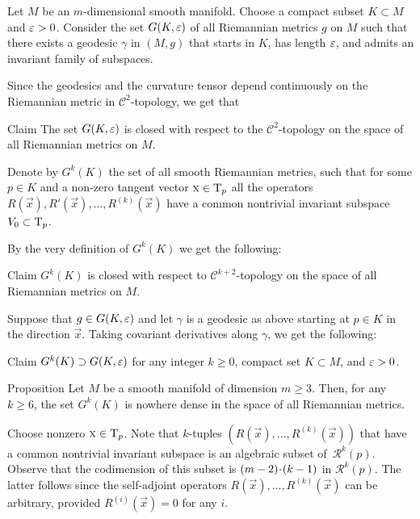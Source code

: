 \documentclass[a4paper,10pt]{article}
\begin{document}
Let $M$ be an $m$-dimensional smooth manifold.
Choose a compact subset $K\subset M$ and $\varepsilon>0$.
Consider the set $G(K,\varepsilon)$ of all Riemannian metrics $g$ on $M$ such that there exists a geodesic $\gamma$ in $(M,g)$ that starts in $K$, has length $\varepsilon$, and admits an invariant family of subspaces.

Since the geodesics and the curvature tensor depend continuously on the Riemannian metric in $\mathcal C^2$-topology, we get that 

\begin{thm}{Claim}\label{clm:G}
The set $G(K,\varepsilon)$ is closed with respect to the $\mathcal C^2$-topology on the space of all Riemannian metrics on $M$.
\end{thm}

Denote by $G^k(K)$ the set of all smooth Riemannian metrics, such that for some $p\in K$ and a non-zero tangent vector $\text{\sc{x}}\in\mathrm{T}_p$ all the operators $R(\vec{x}),R'(\vec{x}),\dots,R^{(k)}(\vec{x})$ have a common nontrivial invariant subspace $V_0\subset \mathrm{T}_p$.

By the very definition of $G^k(K)$ we get the following:

\begin{thm}{Claim} $G^k(K)$ is closed with respect to $\mathcal C^{k+2}$-topology on the space of all Riemannian metrics on $M$.
\end{thm}

Suppose that $g\in G(K,\varepsilon)$ and let $\gamma$ is a geodesic as above starting at $p\in K$ in the direction $\vec{x}$.
Taking covariant derivatives along $\gamma$, we get the following:

\begin{thm}{Claim}
$G^k(K)\z\supset G(K,\eps)$ for any integer $k\ge 0$, compact set $K\subset M$, and $\varepsilon>0$.
\end{thm}


\begin{thm}{Proposition}\label{prop:G}
Let $M$ be a smooth manifold of dimension $m\ge3$.
Then, for any $k\geq 6$, the set $G^k(K)$ is nowhere dense in the space of all Riemannian metrics.
\end{thm}

Choose nonzero $\text{\sc{x}}\in \mathrm{T}_p$.
Note that $k$-tuples $(R(\vec{x}),...,R^{(k)}(\vec{x}))$ that have a common nontrivial invariant subspace is an algebraic subset of~$\mathcal{R}^k(p)$.
Observe that the codimension of this subset is $(m-2)\z\cdot (k-1)$ in $\mathcal{R}^k(p)$.
The latter follows since the self-adjoint operators $R(\vec{x}),...,R^{(k)}(\vec{x})$ can be arbitrary, provided $R^{(i)}(\vec{x})=0$ for any $i$.
\end{document}
